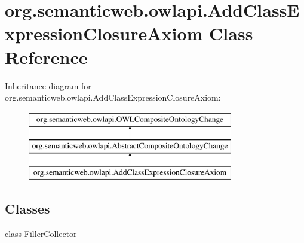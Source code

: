 \hypertarget{classorg_1_1semanticweb_1_1owlapi_1_1_add_class_expression_closure_axiom}{\section{org.\-semanticweb.\-owlapi.\-Add\-Class\-Expression\-Closure\-Axiom Class Reference}
\label{classorg_1_1semanticweb_1_1owlapi_1_1_add_class_expression_closure_axiom}
}
Inheritance diagram for org.\-semanticweb.\-owlapi.\-Add\-Class\-Expression\-Closure\-Axiom\-:\begin{figure}[H]
\begin{center}
\leavevmode
\includegraphics[height=3.000000cm]{classorg_1_1semanticweb_1_1owlapi_1_1_add_class_expression_closure_axiom}
\end{center}
\end{figure}
\subsection*{Classes}
\begin{DoxyCompactItemize}
\item 
class \hyperlink{classorg_1_1semanticweb_1_1owlapi_1_1_add_class_expression_closure_axiom_1_1_filler_collector}{Filler\-Collector}
\end{DoxyCompactItemize}
